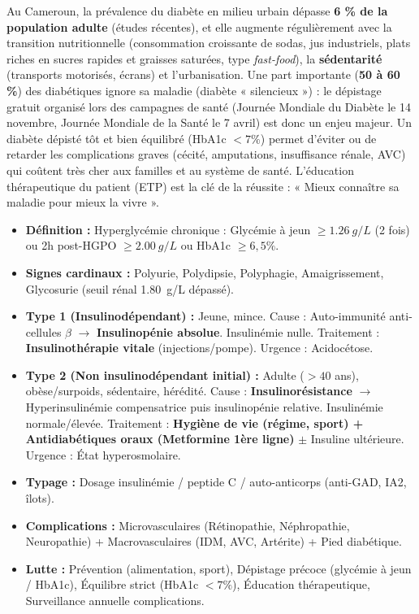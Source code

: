 \documentclass[11pt]{article}
\begin{document}
\begin{savaistu}
Au Cameroun, la prévalence du diabète en milieu urbain dépasse \textbf{6 \% de la population adulte} (études récentes), et elle augmente régulièrement avec la transition nutritionnelle (consommation croissante de sodas, jus industriels, plats riches en sucres rapides et graisses saturées, type \emph{fast-food}), la \textbf{sédentarité} (transports motorisés, écrans) et l'urbanisation. Une part importante (\textbf{50 à 60 \%}) des diabétiques ignore sa maladie (diabète « silencieux ») : le dépistage gratuit organisé lors des campagnes de santé (Journée Mondiale du Diabète le 14 novembre, Journée Mondiale de la Santé le 7 avril) est donc un enjeu majeur. Un diabète dépisté tôt et bien équilibré (HbA1c $< 7\%$) permet d'éviter ou de retarder les complications graves (cécité, amputations, insuffisance rénale, AVC) qui coûtent très cher aux familles et au système de santé. L'éducation thérapeutique du patient (ETP) est la clé de la réussite : « Mieux connaître sa maladie pour mieux la vivre ».
\end{savaistu}

\begin{aretenir}
\begin{itemize}
\item \textbf{Définition :} Hyperglycémie chronique : Glycémie à jeun $\geq \SI{1,26}{g/L}$ (2 fois) ou 2h post-HGPO $\geq \SI{2,00}{g/L}$ ou HbA1c $\geq 6,5\%$.
\item \textbf{Signes cardinaux :} Polyurie, Polydipsie, Polyphagie, Amaigrissement, Glycosurie (seuil rénal \SI{1,80}{g/L} dépassé).
\item \textbf{Type 1 (Insulinodépendant) :} Jeune, mince. Cause : Auto-immunité anti-cellules $\beta$ $\rightarrow$ \textbf{Insulinopénie absolue}. Insulinémie nulle. Traitement : \textbf{Insulinothérapie vitale} (injections/pompe). Urgence : Acidocétose.
\item \textbf{Type 2 (Non insulinodépendant initial) :} Adulte ($>40$ ans), obèse/surpoids, sédentaire, hérédité. Cause : \textbf{Insulinorésistance} $\rightarrow$ Hyperinsulinémie compensatrice puis insulinopénie relative. Insulinémie normale/élevée. Traitement : \textbf{Hygiène de vie (régime, sport) + Antidiabétiques oraux (Metformine 1ère ligne)} $\pm$ Insuline ultérieure. Urgence : État hyperosmolaire.
\item \textbf{Typage :} Dosage insulinémie / peptide C / auto-anticorps (anti-GAD, IA2, îlots).
\item \textbf{Complications :} Microvasculaires (Rétinopathie, Néphropathie, Neuropathie) + Macrovasculaires (IDM, AVC, Artérite) + Pied diabétique.
\item \textbf{Lutte :} Prévention (alimentation, sport), Dépistage précoce (glycémie à jeun / HbA1c), Équilibre strict (HbA1c $< 7\%$), Éducation thérapeutique, Surveillance annuelle complications.
\end{itemize}
\end{aretenir}
\end{document}
